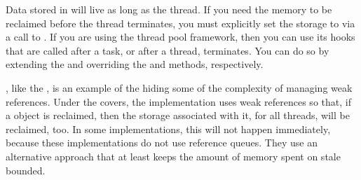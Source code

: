 Data stored in \tls will live as long as the thread. If you need
the memory to be reclaimed before the thread terminates, you must explicitly set
the storage to  via a call to . If you are using
the  thread pool framework, then you can use its
hooks that are called after a task, or after a thread, terminates. You can do so
by extending the  and overriding the
 and  methods, respectively.

\Tls, like the , is an example of the \jre hiding some of the
complexity of managing weak references. Under the covers, the \tls implementation
uses weak references so that, if a  object is reclaimed, then
the storage associated with it, for all threads, will be reclaimed, too. In some
implementations, this will not happen immediately, because these implementations
do not use reference queues. They use an alternative approach that at least
keeps the amount of memory spent on stale \tls bounded.
